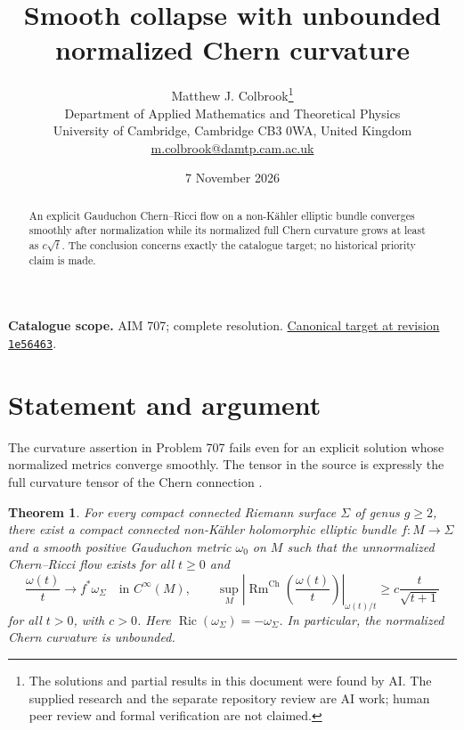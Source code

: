 \documentclass[11pt,a4paper]{article}
\newtheorem{theorem}{Theorem}[section]
\theoremstyle{remark}
\begin{document}
\title{Smooth collapse with unbounded normalized Chern curvature}
\author{Matthew J. Colbrook\thanks{The solutions and partial results in this document were found by AI. The supplied research and the separate repository review are AI work; human peer review and formal verification are not claimed.}\\[4pt]
\small Department of Applied Mathematics and Theoretical Physics\\
\small University of Cambridge, Cambridge CB3 0WA, United Kingdom\\
\small\href{mailto:m.colbrook@damtp.cam.ac.uk}{m.colbrook@damtp.cam.ac.uk}}
\date{7 November 2026}
\maketitle
\begin{abstract}
An explicit Gauduchon Chern--Ricci flow on a non-K\"ahler elliptic bundle converges smoothly after normalization while its normalized full Chern curvature grows at least as $c\sqrt t$. The conclusion concerns exactly the catalogue target; no historical priority claim is made.
\end{abstract}
\noindent\textbf{Catalogue scope.} AIM 707; complete resolution. \href{https://github.com/MColbrook/AIM/blob/1e564633494c109edfd3ec46da1366adcff925a5/problems/707-smooth-chernricci-collapse-on-non-kahler-elliptic-bundles.md}{Canonical target at revision \texttt{1e56463}}.


\section{Statement and argument}

The curvature assertion in Problem 707 fails even for an explicit solution whose normalized metrics converge smoothly. The tensor in the source is expressly the full curvature tensor of the Chern connection \cite[Conjecture 4.2]{TosattiWeinkove2022}.

\begin{theorem}
For every compact connected Riemann surface $\Sigma$ of genus $g\ge2$, there exist a compact connected non-K\"ahler holomorphic elliptic bundle $f:M\to\Sigma$ and a smooth positive Gauduchon metric $\omega_0$ on $M$ such that the unnormalized Chern--Ricci flow exists for all $t\ge0$ and
\[
\frac{\omega(t)}t\longrightarrow f^*\omega_\Sigma\quad\text{in }C^\infty(M),
\qquad
\sup_M\left|\operatorname{Rm}^{\mathrm{Ch}}\left(\frac{\omega(t)}t\right)\right|_{\omega(t)/t}
\ge c\frac{t}{\sqrt{t+1}}
\]
for all $t>0$, with $c>0$. Here $\operatorname{Ric}(\omega_\Sigma)=-\omega_\Sigma$. In particular, the normalized Chern curvature is unbounded.
\end{theorem}
\end{document}
